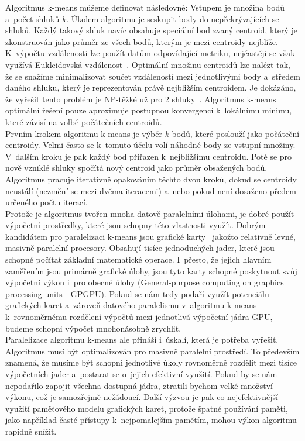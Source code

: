 Algoritmus k-means můžeme definovat následovně: Vstupem je množina bodů a~počet shluků $k$. Úkolem algoritmu je seskupit body do nepřekrývajících se shluků. Každý takový shluk navíc obsahuje speciální bod zvaný centroid, který je zkonstruován jako průměr ze všech bodů, kterým je mezi centroidy nejblíže. K~výpočtu vzdálenosti lze použít datům odpovídající metriku, nejčastěji se však využívá Eukleidovská vzdálenost~\cite{Zechner09}. Optimální množinu centroidů lze nalézt tak, že se snažíme minimalizovat součet vzdáleností mezi jednotlivými body a~středem daného shluku, který je reprezentován právě nejbližším centroidem. Je dokázáno, že vyřešit tento problém je NP-těžké už pro 2 shluky~\cite{Drineas04}. Algoritmus k-means optimální řešení pouze aproximuje postupnou konvergencí k~lokálnímu minimu, které závisí na volbě počátečních centroidů.\\

Prvním krokem algoritmu k-means je výběr $k$ bodů, které poslouží jako počáteční centroidy. Velmi často se k~tomuto účelu volí náhodné body ze vstupní množiny. V~dalším kroku je pak každý bod přiřazen k~nejbližšímu centroidu. Poté se pro nově vzniklé shluky spočítá nový centroid jako průměr obsažených bodů. Algoritmus pracuje iterativně opakováním těchto dvou kroků, dokud se centroidy neustálí (nezmění se mezi dvěma iteracemi) a~nebo pokud není dosaženo předem určeného počtu iterací.\\

Protože je algoritmus tvořen mnoha datově paralelními úlohami, je dobré použít výpočetní prostředky, které jsou schopny této vlastnosti využít.
Dobrým kandidátem pro paralelizaci k-means jsou grafické karty~\cite{Zechner09} jakožto relativně levné, masivně paralelní procesory. Obsahují tisíce jednoduchých jader, které jsou schopné počítat základní matematické operace. I~přesto, že jejich hlavním zaměřením jsou primárně grafické úlohy, jsou tyto karty schopné poskytnout svůj výpočetní výkon i~pro obecné úlohy (General-purpose computing on graphics processing units - GPGPU). Pokud se nám tedy podaří využít potenciálu grafických karet a~zároveň datového paralelismu v~algoritmu k-means k~rovnoměrnému rozdělení výpočtů mezi jednotlivá výpočetní jádra GPU, budeme schopni výpočet mnohonásobně zrychlit.\\

Paralelizace algoritmu k-means ale přináší i~úskalí, která je potřeba vyřešit. Algoritmus musí být optimalizován pro masivně paralelní prostředí. To především znamená, že musíme být schopni jednotlivé úkoly rovnoměrně rozdělit mezi tisíce výpočetních jader a~postarat se o~jejich efektivní využití. Pokud by se nám nepodařilo zapojit všechna dostupná jádra, ztratili bychom velké množství výkonu, což je samozřejmě nežádoucí. Další výzvou je pak co nejefektivnější využití paměťového modelu grafických karet, protože špatné používání paměti, jako na\-pří\-klad časté přístupy k~nejpomalejším pamětím, mohou výkon algoritmu rapidně snížit.\\

